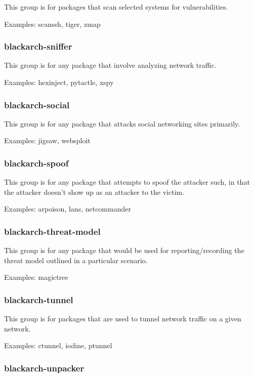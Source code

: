 \documentclass[a4paper, oneside, 11pt]{book}
\begin{document}
This group is for packages that scan selected systems for vulnerabilities.

Examples: scanssh, tiger, zmap

\subsubsection{blackarch-sniffer}

This group is for any package that involve analyzing network traffic.

Examples: hexinject, pytactle, xspy

\subsubsection{blackarch-social}

This group is for any package that attacks social networking sites primarily.

Examples: jigsaw, websploit

\subsubsection{blackarch-spoof}

This group is for any package that attempts to spoof the attacker such, in that the attacker doesn't show up as an attacker to the victim.

Examples: arpoison, lans, netcommander

\subsubsection{blackarch-threat-model}

This group is for any package that would be used for reporting/recording the threat model outlined in a particular scenario.

Examples: magictree

\subsubsection{blackarch-tunnel}

This group is for packages that are used to tunnel network traffic on a given network.

Examples: ctunnel, iodine, ptunnel

\subsubsection{blackarch-unpacker}
\end{document}
